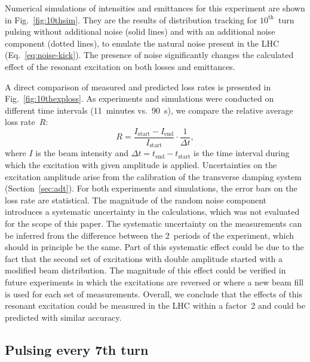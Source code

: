 \documentclass[%
 reprint,
 amsmath,amssymb,
 aps,
prstab,
longbibliography
]{revtex4-1}
\begin{document}
Numerical simulations of intensities and emittances for this
experiment are shown in Fig.~\ref{fig:10thsim}. They are the results
of distribution tracking for $10^{\mathrm{th}}$~turn pulsing without
additional noise (solid lines) and with an additional noise component
(dotted lines), to emulate the natural noise present in the LHC
(Eq.~\ref{eq:noise-kick}). The presence of noise significantly changes
the calculated effect of the resonant excitation on both losses and
emittances.

A direct comparison of measured and predicted loss rates is presented
in Fig.~\ref{fig:10thexploss}. As experiments and simulations were
conducted on different time intervals (11~minutes vs.\ 90~s), we
compare the relative average loss rate~$R$:
%
\begin{equation}
  \label{eqn:lossrate}
  R = \frac{I_{\mathrm{start}} - I_{\mathrm{end}}}{I_{\mathrm{start}}}
  \cdot \frac{1}{\Delta t},
\end{equation}
%
where $I$ is the beam intensity and
$\Delta t = t_\mathrm{end} - t_\mathrm{start}$ is the time interval
during which the excitation with given amplitude is
applied. Uncertainties on the excitation amplitude arise from the
calibration of the transverse damping system
(Section~\ref{sec:adt}). For both experiments and simulations, the
error bars on the loss rate are statistical. The magnitude of the
random noise component introduces a systematic uncertainty in the
calculations, which was not evaluated for the scope of this paper. The
systematic uncertainty on the measurements can be inferred from the
difference between the 2~periods of the experiment, which should in
principle be the same. Part of this systematic effect could be due to
the fact that the second set of excitations with double amplitude
started with a modified beam distribution. The magnitude of this
effect could be verified in future experiments in which the
excitations are reversed or where a new beam fill is used for each set
of measurements. Overall, we conclude that the effects of this
resonant excitation could be measured in the LHC within a factor~2 and
could be predicted with similar accuracy.



\subsection{Pulsing every 7th turn}
\label{sec:simex7}
\end{document}
